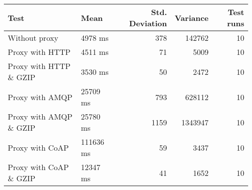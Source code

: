 \begin{tabularx}{\textwidth}{llrrr}
\hline
 Test                   & Mean      &   Std. Deviation &   Variance &   Test runs \\
\hline
 Without proxy          & 4978 ms   &              378 &     142762 &          10 \\
 Proxy with HTTP        & 4511 ms   &               71 &       5009 &          10 \\
 Proxy with HTTP \& GZIP & 3530 ms   &               50 &       2472 &          10 \\
 Proxy with AMQP        & 25709 ms  &              793 &     628112 &          10 \\
 Proxy with AMQP \& GZIP & 25780 ms  &             1159 &    1343947 &          10 \\
 Proxy with CoAP        & 111636 ms &               59 &       3437 &          10 \\
 Proxy with CoAP \& GZIP & 12347 ms  &               41 &       1652 &          10 \\
\hline
\end{tabularx}